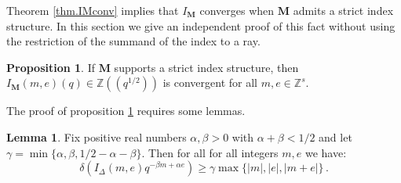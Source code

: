 \documentclass[12pt]{amsart}
\theoremstyle{definition}
\newtheorem{proposition}[theorem]{Proposition}
\newtheorem{lemma}[theorem]{Lemma}
\def\BZ{\mathbb Z}
\def\a{\alpha}
\def\ga{\gamma}
\def\d{\delta}
\def\b{\beta}
\def\ID{I_{\Delta}}
\newcommand{\mb}{\mathbf}
\numberwithin{equation}{section}
\begin{document}
Theorem \ref{thm.IMconv} implies that $I_{\mb M}$ converges when 
$\mb M$ admits a strict index structure. In this section we give an 
independent proof of this fact without using the restriction of the summand
of the index to a ray.

\begin{proposition}
\label{prop.IMconv.strict}
If $\mb M$ supports a strict index structure, 
then $I_{\mb M}(m,e)(q) \in \BZ((q^{1/2}))$ 
is convergent for all $m,e \in \BZ^s$.
\end{proposition}

The proof of proposition \ref{prop.IMconv.strict} requires some lemmas.

\begin{lemma}
\label{lem.Iconv}
Fix positive real numbers $\a,\b >0$ with $\a+\b < 1/2$ and let 
$\ga = \min\{\a,\b,1/2-\a-\b\}$. Then for all for all integers
$m,e$ we have:
$$
\d(\ID(m,e) q^{-\b m + \a e}) \geq \ga \max\{|m|,|e|,|m+e|\} 
\,.
$$
\end{lemma}
\end{document}
